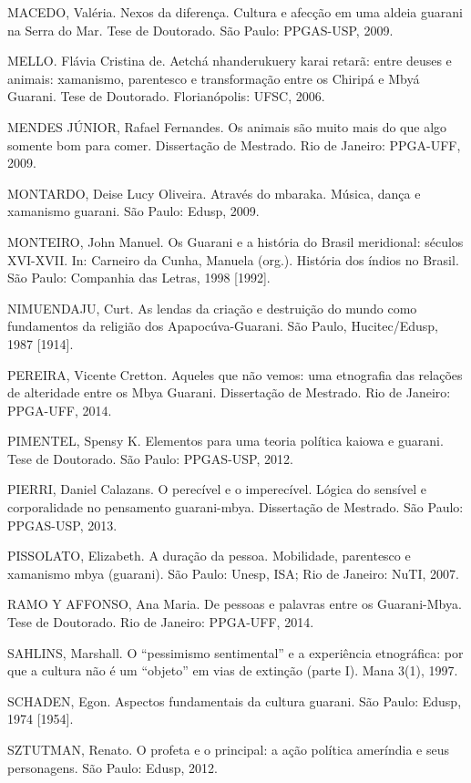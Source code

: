 MACEDO, Valéria. Nexos da diferença. Cultura e afecção em uma aldeia
guarani na Serra do Mar. Tese de Doutorado. São Paulo: PPGAS-USP, 2009.

MELLO. Flávia Cristina de. Aetchá nhanderukuery karai retarã: entre
deuses e animais: xamanismo, parentesco e transformação entre os
Chiripá e Mbyá Guarani. Tese de Doutorado. Florianópolis: UFSC, 2006.

MENDES JÚNIOR, Rafael Fernandes. Os animais são muito mais do que algo
somente bom para comer. Dissertação de Mestrado. Rio de Janeiro:
PPGA-UFF, 2009.

MONTARDO, Deise Lucy Oliveira. Através do mbaraka. Música, dança e
xamanismo guarani. São Paulo: Edusp, 2009.

MONTEIRO, John Manuel. Os Guarani e a história do Brasil meridional:
séculos XVI-XVII. In: Carneiro da Cunha, Manuela (org.). História dos
índios no Brasil. São Paulo: Companhia das Letras, 1998 [1992].

NIMUENDAJU, Curt. As lendas da criação e destruição do mundo como
fundamentos da religião dos Apapocúva-Guarani. São Paulo,
Hucitec/Edusp, 1987 [1914].

PEREIRA, Vicente Cretton. Aqueles que não vemos: uma etnografia das
relações de alteridade entre os Mbya Guarani. Dissertação de Mestrado.
Rio de Janeiro: PPGA-UFF, 2014.

PIMENTEL, Spensy K. Elementos para uma teoria política kaiowa e guarani.
Tese de Doutorado. São Paulo: PPGAS-USP, 2012.

PIERRI, Daniel Calazans. O perecível e o imperecível. Lógica do sensível
e corporalidade no pensamento guarani-mbya. Dissertação de Mestrado.
São Paulo: PPGAS-USP, 2013.

PISSOLATO, Elizabeth. A duração da pessoa. Mobilidade, parentesco e
xamanismo mbya (guarani). São Paulo: Unesp, ISA; Rio de Janeiro: NuTI,
2007.

RAMO Y AFFONSO, Ana Maria. De pessoas e palavras entre os Guarani-Mbya.
Tese de Doutorado. Rio de Janeiro: PPGA-UFF, 2014.

SAHLINS, Marshall. O ``pessimismo sentimental'' e a experiência
etnográfica: por que a cultura não é um ``objeto'' em vias de extinção
(parte I). Mana 3(1), 1997.

SCHADEN, Egon. Aspectos fundamentais da cultura guarani. São Paulo:
Edusp, 1974 [1954].

SZTUTMAN, Renato. O profeta e o principal: a ação política ameríndia e
seus personagens. São Paulo: Edusp, 2012.

